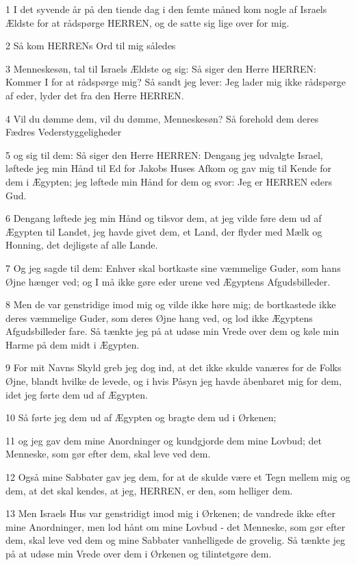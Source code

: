 \par 1 I det syvende år på den tiende dag i den femte måned kom nogle af Israels Ældste for at rådspørge HERREN, og de satte sig lige over for mig.
\par 2 Så kom HERRENs Ord til mig således
\par 3 Menneskesøn, tal til Israels Ældste og sig: Så siger den Herre HERREN: Kommer I for at rådspørge mig? Så sandt jeg lever: Jeg lader mig ikke rådspørge af eder, lyder det fra den Herre HERREN.
\par 4 Vil du dømme dem, vil du dømme, Menneskesøn? Så forehold dem deres Fædres Vederstyggeligheder
\par 5 og sig til dem: Så siger den Herre HERREN: Dengang jeg udvalgte Israel, løftede jeg min Hånd til Ed for Jakobs Huses Afkom og gav mig til Kende for dem i Ægypten; jeg løftede min Hånd for dem og svor: Jeg er HERREN eders Gud.
\par 6 Dengang løftede jeg min Hånd og tilsvor dem, at jeg vilde føre dem ud af Ægypten til Landet, jeg havde givet dem, et Land, der flyder med Mælk og Honning, det dejligste af alle Lande.
\par 7 Og jeg sagde til dem: Enhver skal bortkaste sine væmmelige Guder, som hans Øjne hænger ved; og I må ikke gøre eder urene ved Ægyptens Afgudsbilleder.
\par 8 Men de var genstridige imod mig og vilde ikke høre mig; de bortkastede ikke deres væmmelige Guder, som deres Øjne hang ved, og lod ikke Ægyptens Afgudsbilleder fare. Så tænkte jeg på at udøse min Vrede over dem og køle min Harme på dem midt i Ægypten.
\par 9 For mit Navns Skyld greb jeg dog ind, at det ikke skulde vanæres for de Folks Øjne, blandt hvilke de levede, og i hvis Påsyn jeg havde åbenbaret mig for dem, idet jeg førte dem ud af Ægypten.
\par 10 Så førte jeg dem ud af Ægypten og bragte dem ud i Ørkenen;
\par 11 og jeg gav dem mine Anordninger og kundgjorde dem mine Lovbud; det Menneske, som gør efter dem, skal leve ved dem.
\par 12 Også mine Sabbater gav jeg dem, for at de skulde være et Tegn mellem mig og dem, at det skal kendes, at jeg, HERREN, er den, som helliger dem.
\par 13 Men Israels Hus var genstridigt imod mig i Ørkenen; de vandrede ikke efter mine Anordninger, men lod hånt om mine Lovbud - det Menneske, som gør efter dem, skal leve ved dem og mine Sabbater vanhelligede de grovelig. Så tænkte jeg på at udøse min Vrede over dem i Ørkenen og tilintetgøre dem.
